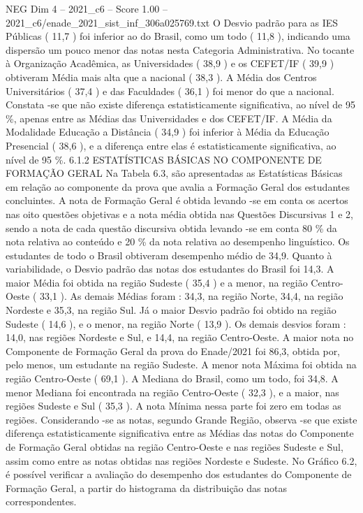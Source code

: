 \begin{textsample}{NEG Dim 4 – 2021\_c6 – Score 1.00 – 2021\_c6/enade\_2021\_sist\_inf\_306a025769.txt}
O Desvio padrão para as IES Públicas ( 11,7 ) foi inferior ao do Brasil, como um todo ( 11,8 ), indicando uma dispersão um pouco menor das notas nesta Categoria Administrativa.
No tocante à Organização Acadêmica, as Universidades ( 38,9 ) e os CEFET/IF ( 39,9 ) obtiveram Média mais alta que a nacional ( 38,3 ).
A Média dos Centros Universitários ( 37,4 ) e das Faculdades ( 36,1 ) foi menor do que a nacional.
Constata -se que não existe diferença estatisticamente significativa, ao nível de 95 \%, apenas entre as Médias das Universidades e dos CEFET/IF.
A Média da Modalidade Educação a Distância ( 34,9 ) foi inferior à Média da Educação Presencial ( 38,6 ), e a diferença entre elas é estatisticamente significativa, ao nível de 95 \%. 6.1.2 ESTATÍSTICAS BÁSICAS NO COMPONENTE DE FORMAÇÃO GERAL Na Tabela 6.3, são apresentadas as Estatísticas Básicas em relação ao componente da prova que avalia a Formação Geral dos estudantes concluintes.
A nota de Formação Geral é obtida levando -se em conta os acertos nas oito questões objetivas e a nota média obtida nas Questões Discursivas 1 e 2, sendo a nota de cada questão discursiva obtida levando -se em conta 80 \% da nota relativa ao conteúdo e 20 \% da nota relativa ao desempenho linguístico.
Os estudantes de todo o Brasil obtiveram desempenho médio de 34,9.
Quanto à variabilidade, o Desvio padrão das notas dos estudantes do Brasil foi 14,3.
A maior Média foi obtida na região Sudeste ( 35,4 ) e a menor, na região Centro-Oeste ( 33,1 ).
As demais Médias foram : 34,3, na região Norte, 34,4, na região Nordeste e 35,3, na região Sul.
Já o maior Desvio padrão foi obtido na região Sudeste ( 14,6 ), e o menor, na região Norte ( 13,9 ).
Os demais desvios foram : 14,0, nas regiões Nordeste e Sul, e 14,4, na região Centro-Oeste.
A maior nota no Componente de Formação Geral da prova do Enade/2021 foi 86,3, obtida por, pelo menos, um estudante na região Sudeste.
A menor nota Máxima foi obtida na região Centro-Oeste ( 69,1 ).
A Mediana do Brasil, como um todo, foi 34,8.
A menor Mediana foi encontrada na região Centro-Oeste ( 32,3 ), e a maior, nas regiões Sudeste e Sul ( 35,3 ).
A nota Mínima nessa parte foi zero em todas as regiões.
Considerando -se as notas, segundo Grande Região, observa -se que existe diferença estatisticamente significativa entre as Médias das notas do Componente de Formação Geral obtidas na região Centro-Oeste e nas regiões Sudeste e Sul, assim como entre as notas obtidas nas regiões Nordeste e Sudeste.
No Gráfico 6.2, é possível verificar a avaliação do desempenho dos estudantes do Componente de Formação Geral, a partir do histograma da distribuição das notas correspondentes.

\end{textsample}
